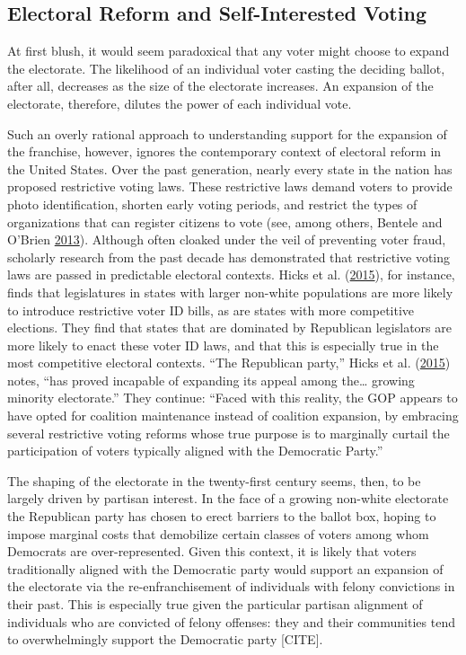 \documentclass[
  12pt,
]{article}
\begin{document}
\hypertarget{electoral-reform-and-self-interested-voting}{%
\subsection*{Electoral Reform and Self-Interested Voting}\label{electoral-reform-and-self-interested-voting}}

At first blush, it would seem paradoxical that any voter might choose to expand the electorate. The likelihood of an individual voter casting the deciding ballot, after all, decreases as the size of the electorate increases. An expansion of the electorate, therefore, dilutes the power of each individual vote.

Such an overly rational approach to understanding support for the expansion of the franchise, however, ignores the contemporary context of electoral reform in the United States. Over the past generation, nearly every state in the nation has proposed restrictive voting laws. These restrictive laws demand voters to provide photo identification, shorten early voting periods, and restrict the types of organizations that can register citizens to vote (see, among others, Bentele and O'Brien \protect\hyperlink{ref-Bentele2013}{2013}). Although often cloaked under the veil of preventing voter fraud, scholarly research from the past decade has demonstrated that restrictive voting laws are passed in predictable electoral contexts. Hicks et al. (\protect\hyperlink{ref-Hicks2015}{2015}), for instance, finds that legislatures in states with larger non-white populations are more likely to introduce restrictive voter ID bills, as are states with more competitive elections. They find that states that are dominated by Republican legislators are more likely to enact these voter ID laws, and that this is especially true in the most competitive electoral contexts. ``The Republican party,'' Hicks et al. (\protect\hyperlink{ref-Hicks2015}{2015}) notes, ``has proved incapable of expanding its appeal among the\ldots{} growing minority electorate.'' They continue: ``Faced with this reality, the GOP appears to have opted for coalition maintenance instead of coalition expansion, by embracing several restrictive voting reforms whose true purpose is to marginally curtail the participation of voters typically aligned with the Democratic Party.''

The shaping of the electorate in the twenty-first century seems, then, to be largely driven by partisan interest. In the face of a growing non-white electorate the Republican party has chosen to erect barriers to the ballot box, hoping to impose marginal costs that demobilize certain classes of voters among whom Democrats are over-represented. Given this context, it is likely that voters traditionally aligned with the Democratic party would support an expansion of the electorate via the re-enfranchisement of individuals with felony convictions in their past. This is especially true given the particular partisan alignment of individuals who are convicted of felony offenses: they and their communities tend to overwhelmingly support the Democratic party {[}CITE{]}.
\end{document}
